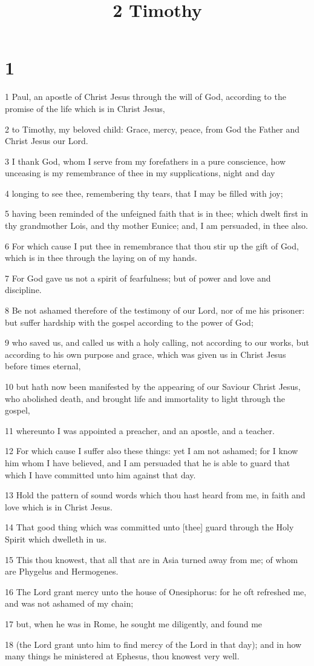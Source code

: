 

\title{2 Timothy}

\chapter{1}

\par 1 Paul, an apostle of Christ Jesus through the will of God, according to the promise of the life which is in Christ Jesus,
\par 2 to Timothy, my beloved child: Grace, mercy, peace, from God the Father and Christ Jesus our Lord.
\par 3 I thank God, whom I serve from my forefathers in a pure conscience, how unceasing is my remembrance of thee in my supplications, night and day
\par 4 longing to see thee, remembering thy tears, that I may be filled with joy;
\par 5 having been reminded of the unfeigned faith that is in thee; which dwelt first in thy grandmother Lois, and thy mother Eunice; and, I am persuaded, in thee also.
\par 6 For which cause I put thee in remembrance that thou stir up the gift of God, which is in thee through the laying on of my hands.
\par 7 For God gave us not a spirit of fearfulness; but of power and love and discipline.
\par 8 Be not ashamed therefore of the testimony of our Lord, nor of me his prisoner: but suffer hardship with the gospel according to the power of God;
\par 9 who saved us, and called us with a holy calling, not according to our works, but according to his own purpose and grace, which was given us in Christ Jesus before times eternal,
\par 10 but hath now been manifested by the appearing of our Saviour Christ Jesus, who abolished death, and brought life and immortality to light through the gospel,
\par 11 whereunto I was appointed a preacher, and an apostle, and a teacher.
\par 12 For which cause I suffer also these things: yet I am not ashamed; for I know him whom I have believed, and I am persuaded that he is able to guard that which I have committed unto him against that day.
\par 13 Hold the pattern of sound words which thou hast heard from me, in faith and love which is in Christ Jesus.
\par 14 That good thing which was committed unto [thee] guard through the Holy Spirit which dwelleth in us.
\par 15 This thou knowest, that all that are in Asia turned away from me; of whom are Phygelus and Hermogenes.
\par 16 The Lord grant mercy unto the house of Onesiphorus: for he oft refreshed me, and was not ashamed of my chain;
\par 17 but, when he was in Rome, he sought me diligently, and found me
\par 18 (the Lord grant unto him to find mercy of the Lord in that day); and in how many things he ministered at Ephesus, thou knowest very well.

